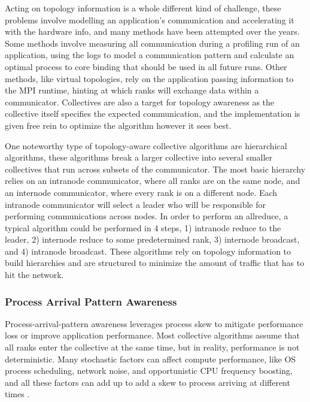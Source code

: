Acting on topology information is a whole different kind of challenge, these problems involve modelling an application's communication and accelerating it with the hardware info, and many methods have been attempted over the years.
Some methods involve measuring all communication during a profiling run of an application, using the logs to model a communication pattern and calculate an optimal process to core binding that should be used in all future runs. 
Other methods, like virtual topologies, rely on the application passing information to the MPI runtime, hinting at which ranks will exchange data within a communicator.
Collectives are also a target for topology awareness as the collective itself specifies the expected communication, and the implementation is given free rein to optimize the algorithm however it sees best.

One noteworthy type of topology-aware collective algorithms are hierarchical algorithms, these algorithms break a larger collective into several smaller collectives that run across subsets of the communicator. 
The most basic hierarchy relies on an intranode communicator, where all ranks are on the same node, and an internode communicator, where every rank is on a different node.
Each intranode communicator will select a leader who will be responsible for performing communications across nodes.
In order to perform an allreduce, a typical algorithm could be performed in 4 steps, 1) intranode reduce to the leader, 2) internode reduce to some predetermined rank, 3) internode broadcast, and 4) intranode broadcast.
These algorithms rely on topology information to build hierarchies and are structured to minimize the amount of traffic that has to hit the network. 

\subsubsection{Process Arrival Pattern Awareness}
Process-arrival-pattern awareness leverages process skew to mitigate performance loss or improve application performance. 
Most collective algorithms assume that all ranks enter the collective at the same time, but in reality, performance is not deterministic.
Many stochastic factors can affect compute performance, like OS process scheduling, network noise, and opportunistic CPU frequency boosting, and all these factors can add up to add a skew to process arriving at different times \cite{Faraj2008StudyProcArrivalMPIColl}.



